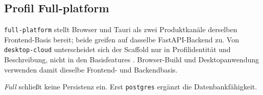 \subsection{Profil Full-platform}
\label{subsec:profil-full-platform}

\texttt{full-platform} stellt Browser und Tauri als zwei Produktkanäle
derselben Frontend-Basis bereit; beide greifen auf dasselbe FastAPI-Backend zu.
Von \texttt{desktop-\allowbreak cloud} unterscheidet sich der Scaffold nur in
Profilidentität und Beschreibung, nicht in den Basisfeatures
\parencite{kleiveist2026profiles,kleiveist2026template}.
Browser-Build und Desktopanwendung verwenden damit dieselbe Frontend- und
Backendbasis.

\emph{Full} schließt keine Persistenz ein. Erst \texttt{postgres} ergänzt die
Datenbankfähigkeit.
